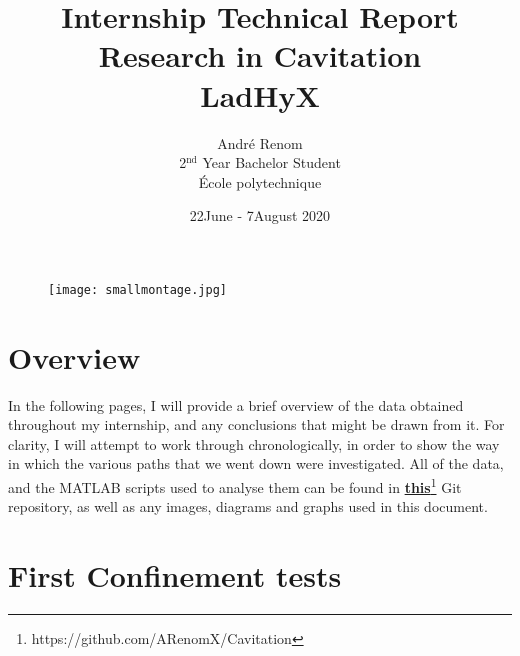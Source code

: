 \documentclass{article}
\title{Internship Technical Report \\Research in Cavitation\\LadHyX}
\date{22\nd June - 7\thh August 2020}
\author{Andr\'e Renom\\2$^{\text{nd}}$ Year Bachelor Student\\ \'Ecole polytechnique}
\begin{document}
	\maketitle

\begin{figure}[H]
    \centering
    \texttt{[image: smallmontage.jpg]}
\end{figure}
\tableofcontents
\newpage
{}
\section{Overview}
In the following pages, I will provide a brief overview of the data obtained throughout my internship, and any conclusions that might be drawn from it.  For clarity, I will attempt to work through chronologically, in order to show the way in which the various paths that we went down were investigated. All of the data, and the MATLAB scripts used to analyse them can be found in \href{https://github.com/ARenomX/Cavitation}{\textbf{this}}\footnote{https://github.com/ARenomX/Cavitation} Git repository, as well as any images, diagrams and graphs used in this document.

\section{First Confinement tests}
\end{document}
